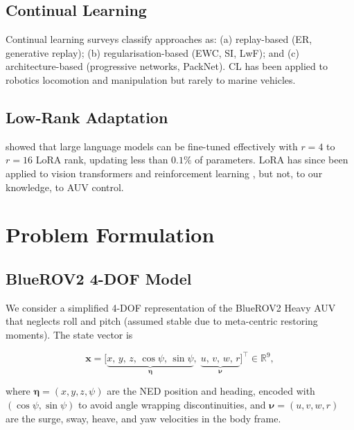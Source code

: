 \documentclass[journal]{IEEEtran}
\newcommand{\R}{\mathbb{R}}
\newcommand{\bx}{\bm{x}}
\newcommand{\bnu}{\bm{\nu}}
\newcommand{\boldeta}{\bm{\eta}}
\begin{document}
\subsection{Continual Learning}

Continual learning surveys \cite{parisi2019continual, delange2021continual}
classify approaches as: (a) replay-based (ER, generative replay); (b)
regularisation-based (EWC, SI, LwF); and (c) architecture-based
(progressive networks, PackNet). CL has been applied to robotics locomotion
\cite{kaplanis2019continual} and manipulation \cite{lesort2020continual}
but rarely to marine vehicles.

\subsection{Low-Rank Adaptation}

\citet{hu2022lora} showed that large language models can be fine-tuned
effectively with $r=4$ to $r=16$ LoRA rank, updating less than $0.1\%$
of parameters. LoRA has since been applied to vision transformers
\cite{zhu2023minigpt} and reinforcement learning
\cite{liang2024loradaptor}, but not, to our knowledge, to AUV control.

\section{Problem Formulation}
\label{sec:problem}

\subsection{BlueROV2 4-DOF Model}

We consider a simplified 4-DOF representation of the BlueROV2 Heavy AUV
that neglects roll and pitch (assumed stable due to meta-centric restoring
moments). The state vector is

\begin{equation}
  \bx = \bigl[\underbrace{x,\, y,\, z,\, \cos\psi,\, \sin\psi}_{\boldeta},\;
               \underbrace{u,\, v,\, w,\, r}_{\bnu}\bigr]^{\top} \in \R^9,
  \label{eq:state}
\end{equation}

where $\boldeta = (x,y,z,\psi)$ are the NED position and heading, encoded
with $(\cos\psi, \sin\psi)$ to avoid angle wrapping discontinuities, and
$\bnu = (u,v,w,r)$ are the surge, sway, heave, and yaw velocities in the
body frame.
\end{document}
